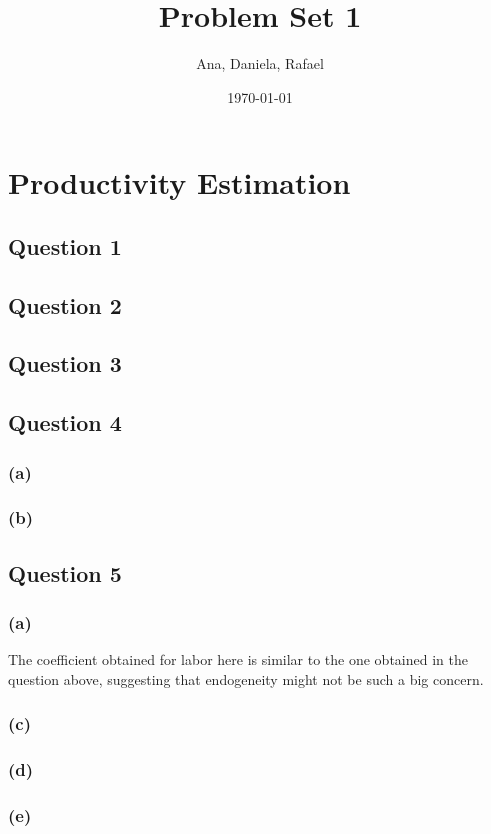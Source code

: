 \documentclass[11pt]{article}
\title{Problem Set 1}
\author{Ana, Daniela, Rafael}
\date{\today}
\begin{document}
\maketitle

\section*{Productivity Estimation}

\subsection*{Question 1}




\FloatBarrier

\newpage
\subsection*{Question 2}

\FloatBarrier

\subsection*{Question 3}

\FloatBarrier

\newpage
\subsection*{Question 4}
\subsubsection*{(a)}

\FloatBarrier

\subsubsection*{(b)}


\FloatBarrier

\subsection*{Question 5}
\subsubsection*{(a)}

\FloatBarrier
The coefficient obtained for labor here is similar to the one obtained in the question above, suggesting that endogeneity might not be such a big concern. 

\subsubsection*{(c)}

\FloatBarrier

\newpage
\subsubsection*{(d)}

\FloatBarrier

\subsubsection*{(e)}

\FloatBarrier
\end{document}
